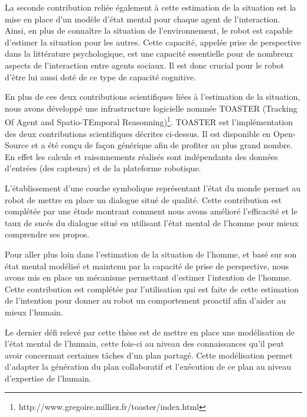 \documentclass[a4paper,11pt,twoside]{StyleThese}
\begin{document}
La seconde contribution reliée également à cette estimation de la situation est la mise en place d'un modèle d'état mental pour chaque agent de l'interaction. Ainsi, en plus de connaître la situation de l'environnement, le robot est capable d'estimer la situation pour les autres. Cette capacité, appelée prise de perspective dans la littérature psychologique, est une capacité essentielle pour de nombreux aspects de l'interaction entre agents sociaux. Il est donc crucial pour le robot d'être lui aussi doté de ce type de capacité cognitive.

En plus de ces deux contributions scientifiques liées à l'estimation de la situation, nous avons développé une infrastructure logicielle nommée TOASTER (Tracking Of Agent and Spatio-TEmporal Reasonning)\footnote{http://www.gregoire.milliez.fr/toaster/index.html}. TOASTER est l'implémentation des deux contributions scientifiques décrites ci-dessus. Il est disponible en Open-Source et a été conçu de façon générique afin de profiter au plus grand nombre. En effet les calculs et raisonnements réalisés sont indépendants des données d'entrées (des capteurs) et de la plateforme robotique.

L'établissement d'une couche symbolique représentant l'état du monde permet au robot de mettre en place un dialogue situé de qualité. Cette contribution est complétée par une étude montrant comment nous avons amélioré l'efficacité et le taux de sucés du dialogue situé en utilisant l'état mental de l'homme pour mieux comprendre ses propos.


Pour aller plus loin dans l'estimation de la situation de l'homme, et basé sur son état mental modélisé et maintenu par la capacité de prise de perspective, nous avons mis en place un mécanisme permettant d'estimer l'intention de l'homme. Cette contribution est complétée par l'utilisation qui est faite de cette estimation de l'intention pour donner au robot un comportement proactif afin d'aider au mieux l'humain. 

Le dernier défi relevé par cette thèse est de mettre en place une modélisation de l'état mental de l'humain, cette fois-ci au niveau des connaissances qu'il peut avoir concernant certaines tâches d'un plan partagé. Cette modélisation permet d'adapter la génération du plan collaboratif et l'exécution de ce plan au niveau d'expertise de l'humain.

\end{document}
